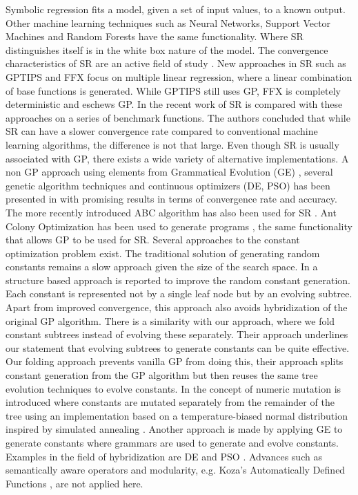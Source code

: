 Symbolic regression fits a model, given a set of input values, to a known output. Other machine learning techniques such as Neural Networks, Support Vector Machines and Random Forests have the same functionality. Where SR distinguishes itself is in the white box nature of the model. The convergence characteristics of SR are an active field of study \citep{SRAccur}. New approaches in SR such as GPTIPS and FFX \citep{GPTIPS, FFX} focus on multiple linear regression, where a linear combination of base functions is generated. While GPTIPS still uses GP, FFX is completely deterministic and eschews GP.
In the recent work of \citep{SRlinear} SR is compared with these approaches on a series of benchmark functions. The authors concluded that while SR can have a slower convergence rate compared to conventional machine learning algorithms, the difference is not that large. Even though SR is usually associated with GP, there exists a wide variety of alternative implementations.
A non GP approach using elements from Grammatical Evolution (GE) \cite{GE}, several genetic algorithm techniques and continuous optimizers (DE, PSO) has been presented in \citep{AEG} with promising results in terms of convergence rate and accuracy. The more recently introduced ABC algorithm has also been used for SR \cite{ABCSR}. Ant Colony Optimization \citep{ACO} has been used to generate programs \citep{ACOSR}, the same functionality that allows GP to be used for SR. Several approaches to the constant optimization problem exist. The traditional solution of generating random constants \citep{GP} remains a slow approach given the size of the search space. In \citep{GPConstAlter} a structure based approach is reported to improve the random constant generation. Each constant is represented not by a single leaf node but by an evolving subtree. Apart from improved convergence, this approach also avoids hybridization of the original GP algorithm. There is a similarity with our approach, where we fold constant subtrees instead of evolving these separately. Their approach underlines our statement that evolving subtrees to generate constants can be quite effective. Our folding approach prevents vanilla GP from doing this, their approach splits constant generation from the GP algorithm but then reuses the same tree evolution techniques to evolve constants. In \citep{GPConst} the concept of numeric mutation is introduced where constants are mutated separately from the remainder of the tree using an implementation based on a temperature-biased normal distribution inspired by simulated annealing \citep{SA}. Another approach is made by applying GE to generate constants \citep{GPConstGE} where grammars are used to generate and evolve constants. Examples in the field of hybridization are DE \citep{GPDE} and PSO \citep{SRBaseline}. Advances such as semantically aware operators \citep {GPSemantics} and modularity, e.g. Koza's Automatically Defined Functions \citep{GP}, are not applied here. 